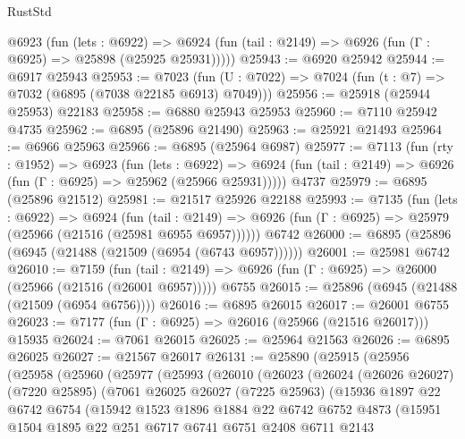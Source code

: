 \begin{lexlean}{RustStd}
\begin{coremodule}
    @6923
      (fun (lets : @6922) =>
      @6924 (fun (tail : @2149) => @6926 (fun (Γ : @6925) => @25898 (@25925 @25931)))))
@25943 := @6920 @25942
@25944 := @6917 @25943
@25953 := @7023
    (fun (U : @7022) => @7024 (fun (t : @7) => @7032 (@6895 (@7038 @22185 @6913) @7049)))
@25956 := @25918 (@25944 @25953) @22183
@25958 := @6880 @25943 @25953
@25960 := @7110 @25942 @4735
@25962 := @6895 (@25896 @21490)
@25963 := @25921 @21493
@25964 := @6966 @25963
@25966 := @6895 (@25964 @6987)
@25977 := @7113
    (fun (rty : @1952) =>
    @6923
      (fun (lets : @6922) =>
      @6924 (fun (tail : @2149) => @6926 (fun (Γ : @6925) => @25962 (@25966 @25931)))))
    @4737
@25979 := @6895 (@25896 @21512)
@25981 := @21517 @25926 @22188
@25993 := @7135
    (fun (lets : @6922) =>
    @6924
      (fun (tail : @2149) =>
      @6926 (fun (Γ : @6925) => @25979 (@25966 (@21516 (@25981 @6955 @6957))))))
    @6742
@26000 := @6895 (@25896 (@6945 (@21488 (@21509 (@6954 (@6743 @6957))))))
@26001 := @25981 @6742
@26010 := @7159
    (fun (tail : @2149) => @6926 (fun (Γ : @6925) => @26000 (@25966 (@21516 (@26001 @6957)))))
    @6755
@26015 := @25896 (@6945 (@21488 (@21509 (@6954 @6756))))
@26016 := @6895 @26015
@26017 := @26001 @6755
@26023 := @7177 (fun (Γ : @6925) => @26016 (@25966 (@21516 @26017))) @15935
@26024 := @7061 @26015
@26025 := @25964 @21563
@26026 := @6895 @26025
@26027 := @21567 @26017
@26131 := @25890
    (@25915
      (@25956
        (@25958
          (@25960
            (@25977
              (@25993
                (@26010
                  (@26023
                    (@26024
                      (@26026 @26027)
                      (@7220 @25895)
                      (@7061
                        @26025
                        @26027
                        (@7225 @25963)
                        (@15936
                          @1897
                          @22
                          @6742
                          @6754
                          (@15942
                            @1523
                            @1896
                            @1884
                            @22
                            @6742
                            @6752
                            @4873
                            (@15951
                              @1504
                              @1895
                              @22
                              @251
                              @6717
                              @6741
                              @6751
                              @2408
                              @6711
                              @2143

\end{coremodule}
\end{lexlean}
